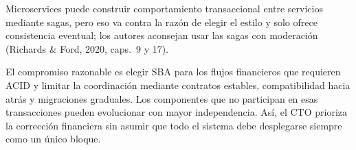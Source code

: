 Microservices puede construir comportamiento transaccional entre servicios
mediante sagas, pero eso va contra la razón de elegir el estilo y solo ofrece
consistencia eventual; los autores aconsejan usar las sagas con moderación
(Richards \& Ford, 2020, caps.~9 y 17).

El compromiso razonable es elegir SBA para los flujos financieros que requieren
ACID y limitar la coordinación mediante contratos estables, compatibilidad hacia
atrás y migraciones graduales. Los componentes que no participan en esas
transacciones pueden evolucionar con mayor independencia. Así, el CTO prioriza la
corrección financiera sin asumir que todo el sistema debe desplegarse siempre como
un único bloque.
